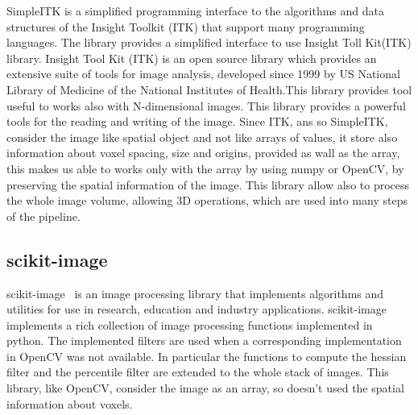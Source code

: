 \documentclass{standalone}
\begin{document}
	SimpleITK is a simplified programming interface to the algorithms and data structures of the Insight Toolkit (ITK) that support many programming languages. The library provides a simplified interface to use Insight Toll Kit(ITK) library. 
	Insight Tool Kit (ITK) is an open source library which provides an extensive suite of tools for image analysis, developed since 1999 by US National Library of Medicine of the National Institutes of Health.This library provides tool useful to works also with N-dimensional images. 
	This library provides a powerful tools for the reading and writing of the image. Since ITK, ans so SimpleITK,  consider the image like spatial object and not like arrays of values, it store also information about voxel spacing, size and origins, provided as wall as the array, this makes us able to works only with the array by using numpy or OpenCV, by preserving the spatial information of the image. This library allow also to process the whole image volume, allowing 3D operations, which are used into many steps of the pipeline.
	
	 \subsection{scikit-image}
	 scikit-image~\cite{scikit-image} is an image processing library that implements algorithms and utilities for use in research, education and industry applications. scikit-image implements a rich collection of image processing functions implemented in python. The implemented filters are used when a corresponding implementation in OpenCV was not available. In particular the functions to compute the hessian filter and the percentile filter are extended to the whole stack of images. This library, like OpenCV, consider the image as an array, so doesn't used the spatial information about voxels.
	
	 
\end{document}

